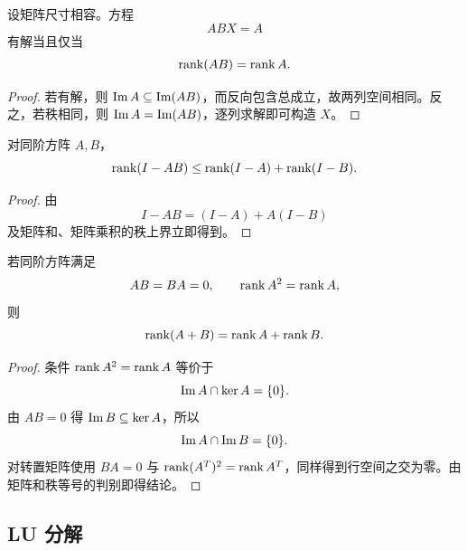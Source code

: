 \begin{proposition}
设矩阵尺寸相容。方程
\begin{equation}
 ABX=A
\end{equation}
有解当且仅当
\begin{equation}
 \operatorname{rank}(AB)=\operatorname{rank} A.
\end{equation}
\end{proposition}

\begin{proof}
若有解，则 $\operatorname{Im} A\subseteq\operatorname{Im}(AB)$，而反向包含总成立，故两列空间相同。反之，若秩相同，则 $\operatorname{Im} A=\operatorname{Im}(AB)$，逐列求解即可构造 $X$。
\end{proof}

\begin{proposition}
对同阶方阵 $A,B$，
\begin{equation}
 \operatorname{rank}(I-AB)\leq\operatorname{rank}(I-A)+\operatorname{rank}(I-B).
\end{equation}
\end{proposition}

\begin{proof}
由
\begin{equation}
 I-AB=(I-A)+A(I-B)
\end{equation}
及矩阵和、矩阵乘积的秩上界立即得到。
\end{proof}

\begin{theorem}
若同阶方阵满足
\begin{equation}
 AB=BA=0,
 \qquad
 \operatorname{rank} A^2=\operatorname{rank} A,
\end{equation}
则
\begin{equation}
 \operatorname{rank}(A+B)=\operatorname{rank} A+\operatorname{rank} B.
\end{equation}
\end{theorem}

\begin{proof}
条件 $\operatorname{rank} A^2=\operatorname{rank} A$ 等价于
\begin{equation}
 \operatorname{Im} A\cap\operatorname{ker} A=\{0\}.
\end{equation}
由 $AB=0$ 得 $\operatorname{Im} B\subseteq\operatorname{ker} A$，所以
\begin{equation}
 \operatorname{Im} A\cap\operatorname{Im} B=\{0\}.
\end{equation}
对转置矩阵使用 $BA=0$ 与 $\operatorname{rank}(A^T)^2=\operatorname{rank} A^T$，同样得到行空间之交为零。由矩阵和秩等号的判别即得结论。
\end{proof}

\subsection{LU 分解}

